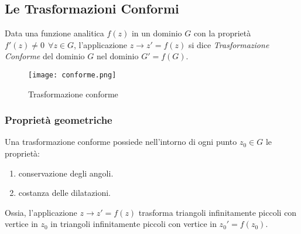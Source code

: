 \documentclass[twoside]{article}
\begin{document}
\subsection{Le Trasformazioni Conformi}

Data una funzione analitica $f(z)$ in un dominio $G$ con la proprietà $f'(z)\ne 0 \ \ \forall z \in G$, l'applicazione $z\to z'=f(z)$ si dice \textit{Trasformazione Conforme} del dominio $G$ nel dominio $G'=f(G)$.

\begin{figure}[h]
\centering
\texttt{[image: conforme.png]}
\label{fig:conforme}
\caption{Trasformazione conforme}
\end{figure}

\subsubsection{Proprietà geometriche}
Una trasformazione conforme possiede nell'intorno di ogni punto $z_0 \in G$ le proprietà:
\begin{enumerate}
    \item conservazione degli angoli.
    \item costanza delle dilatazioni.
\end{enumerate}
Ossia, l'applicazione $z\to z'=f(z)$ trasforma triangoli infinitamente piccoli con vertice in $z_0$ in triangoli infinitamente piccoli con vertice in $z_0 ' = f(z_0)$.
\end{document}
